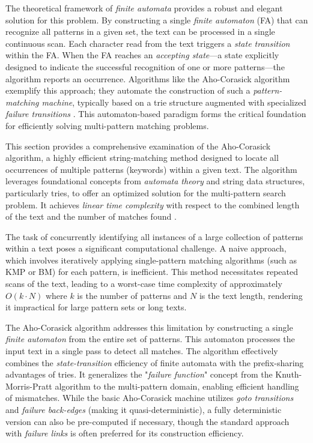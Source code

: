 The theoretical framework of \textit{finite automata} provides a robust and elegant solution for this problem. By constructing a single \textit{finite automaton} (FA) that can recognize all patterns in a given set, the text can be processed in a single continuous scan. Each character read from the text triggers a \textit{state transition} within the FA. When the FA reaches an \textit{accepting state}---a state explicitly designed to indicate the successful recognition of one or more patterns---the algorithm reports an occurrence. Algorithms like the Aho-Corasick algorithm exemplify this approach; they automate the construction of such a \textit{pattern-matching machine}, typically based on a trie structure augmented with specialized \textit{failure transitions} \cite{AhoCorasick1975}. This automaton-based paradigm forms the critical foundation for efficiently solving multi-pattern matching problems.




This section provides a comprehensive examination of the Aho-Corasick algorithm, a highly efficient string-matching method designed to locate all occurrences of multiple patterns (keywords) within a given text. The algorithm leverages foundational concepts from \textit{automata theory} and string data structures, particularly tries, to offer an optimized solution for the multi-pattern search problem. It achieves \textit{linear time complexity} with respect to the combined length of the text and the number of matches found \cite{AhoCorasick1975}.


The task of concurrently identifying all instances of a large collection of patterns within a text poses a significant computational challenge. A naive approach, which involves iteratively applying single-pattern matching algorithms (such as KMP or BM) for each pattern, is inefficient. This method necessitates repeated scans of the text, leading to a worst-case time complexity of approximately $O(k \cdot N)$ where $k$ is the number of patterns and $N$ is the text length, rendering it impractical for large pattern sets or long texts.

The Aho-Corasick algorithm addresses this limitation by constructing a single \textit{finite automaton} from the entire set of patterns. This automaton processes the input text in a single pass to detect all matches. The algorithm effectively combines the \textit{state-transition} efficiency of finite automata with the prefix-sharing advantages of tries. It generalizes the "\textit{failure function}" concept from the Knuth-Morris-Pratt algorithm to the multi-pattern domain, enabling efficient handling of mismatches. While the basic Aho-Corasick machine utilizes \textit{goto transitions} and \textit{failure back-edges} (making it quasi-deterministic), a fully deterministic version can also be pre-computed if necessary, though the standard approach with \textit{failure links} is often preferred for its construction efficiency.

